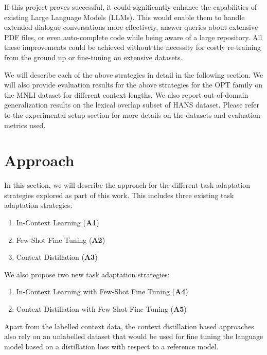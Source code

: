 \documentclass[10pt,twocolumn,letterpaper]{article}
\begin{document}
If this project proves successful, it could significantly enhance the capabilities of existing Large Language Models (LLMs). This would enable them to handle extended dialogue conversations more effectively, answer queries about extensive PDF files, or even auto-complete code while being aware of a large repository. All these improvements could be achieved without the necessity for costly re-training from the ground up or fine-tuning on extensive datasets.


We will describe each of the above strategies in detail in the following section. We will also provide evaluation results for the above strategies for the OPT family on the MNLI dataset for different context lengths. We also report out-of-domain generalization results on the lexical overlap subset of HANS dataset. Please refer to the experimental setup section for more details on the datasets and evaluation metrics used.

\section{Approach}
In this section, we will describe the approach for the different task adaptation strategies explored as part of this work. This includes three existing task adaptation strategies:
\begin{enumerate}
    \item In-Context Learning (\textbf{A1})
	\item Few-Shot Fine Tuning (\textbf{A2})
	\item Context Distillation (\textbf{A3})
\end{enumerate}
We also propose two new task adaptation strategies:
\begin{enumerate}
	\item In-Context Learning with Few-Shot Fine Tuning (\textbf{A4})
	\item Context Distillation with Few-Shot Fine Tuning (\textbf{A5})
\end{enumerate}
Apart from the labelled context data, the context distillation based approaches also rely on an unlabelled dataset that would be used for fine tuning the language model based on a distillation loss with respect to a reference model. 
\end{document}
